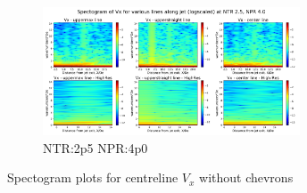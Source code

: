\begin{figure}[H]
\begin{subfigure}{0.5\textwidth}
	\label{fig:spectogramVx2p52p5}
\end{subfigure}%
\begin{subfigure}{0.5\textwidth}
	\centering
	\includegraphics[width=3in]{images/Spectogram_Vx_NTR2p5_NPR4p0.png}
	\caption{NTR:2p5 NPR:4p0 }
	\label{fig:spectogramVx2p53p6}
\end{subfigure}
\caption{Spectogram plots for centreline $V_x$ without chevrons }
\label{fig:spectogramVx}
\end{figure} 

